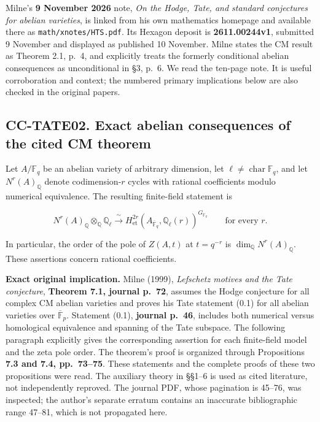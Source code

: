 Milne's \textbf{9 November 2026} note, \emph{On the Hodge, Tate, and
standard conjectures for abelian varieties}, is linked from his own
mathematics homepage and available there as
\texttt{math/xnotes/HTS.pdf}. Its Hexagon deposit is
\textbf{2611.00244v1}, submitted 9 November and displayed as published
10 November. Milne states the CM result as Theorem 2.1, p.~4, and
explicitly treats the formerly conditional abelian consequences as
unconditional in §3, p.~6. We read the ten-page note. It is useful
corroboration and context; the numbered primary implications below are
also checked in the original papers.

\subsection{CC-TATE02. Exact abelian consequences of the cited CM
theorem}\label{cc-tate02.-exact-abelian-consequences-of-the-cited-cm-theorem}

Let \(A/\mathbb F_q\) be an abelian variety of arbitrary dimension, let
\(\ell\ne\operatorname{char}\mathbb F_q\), and let
\(N^r(A)_{\mathbb Q}\) denote codimension-\(r\) cycles with rational
coefficients modulo numerical equivalence. The resulting finite-field
statement is

\[
N^r(A)_{\mathbb Q}\otimes_{\mathbb Q}\mathbb Q_\ell
\xrightarrow{\ \sim\ }
H^{2r}_{\mathrm{et}}(A_{\overline{\mathbb F}_q},\mathbb Q_\ell(r))^{G_{\mathbb F_q}}
\qquad\text{for every }r.
\]

In particular, the order of the pole of \(Z(A,t)\) at \(t=q^{-r}\) is
\(\dim_{\mathbb Q}N^r(A)_{\mathbb Q}\). These assertions concern
rational coefficients.

\textbf{Exact original implication.} Milne (1999), \emph{Lefschetz
motives and the Tate conjecture}, \textbf{Theorem 7.1, journal p.~72},
assumes the Hodge conjecture for all complex CM abelian varieties and
proves his Tate statement (0.1) for all abelian varieties over
\(\overline{\mathbb F}_p\). Statement (0.1), \textbf{journal p.~46},
includes both numerical versus homological equivalence and spanning of
the Tate subspace. The following paragraph explicitly gives the
corresponding assertion for each finite-field model and the zeta pole
order. The theorem's proof is organized through Propositions \textbf{7.3
and 7.4, pp.~73--75}. These statements and the complete proofs of these
two propositions were read. The auxiliary theory in §§1--6 is used as
cited literature, not independently reproved. The journal PDF, whose
pagination is 45--76, was inspected; the author's separate erratum
contains an inaccurate bibliographic range 47--81, which is not
propagated here.

